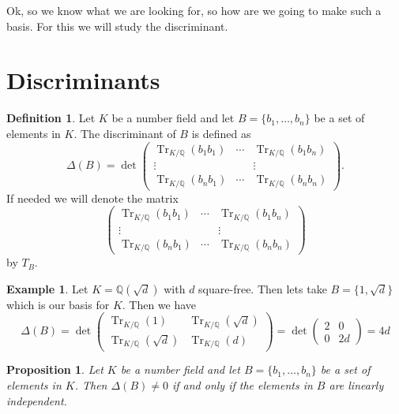 \documentclass[11pt,a4paper]{report}
\theoremstyle{plain}
\newtheorem{prop}[subsection]{Proposition}
\theoremstyle{definition}
\newtheorem{definition}[subsection]{Definition}
\newtheorem{exmp}[subsection]{Example}
\theoremstyle{definition}
\newcommand{\Tr}{\operatorname{Tr}}
\def\QQ{\mathbb{Q}}
\newcommand{\matrd}[4]{\begin{pmatrix}#1&#2\\#3&#4\end{pmatrix}}
\begin{document}
	Ok, so we know what we are looking for, so how are we going to make such a basis. For this we will study the discriminant.
	
	\section{Discriminants}
	
	\begin{definition}
		Let $K$ be a number field and let $B=\{b_1,\dots,b_n\}$ be a set of elements in $K$. The discriminant of $B$ is defined as \[\Delta(B)=  \det \left (\begin{matrix} \Tr_{K/\QQ}(b_1b_1) &\cdots& \Tr_{K/\QQ}(b_1b_n)\\ \vdots & & \vdots \\  \Tr_{K/\QQ}(b_nb_1) &\cdots& \Tr_{K/\QQ}(b_nb_n)
		\end{matrix} \right ).\] If needed we will denote the matrix \[\left (\begin{matrix} \Tr_{K/\QQ}(b_1b_1) &\cdots& \Tr_{K/\QQ}(b_1b_n)\\ \vdots & & \vdots \\  \Tr_{K/\QQ}(b_nb_1) &\cdots& \Tr_{K/\QQ}(b_nb_n)
		\end{matrix} \right )\] by $T_B$.
	\end{definition}
	
	\begin{exmp}
		Let $K=\QQ(\sqrt{d})$ with $d$ square-free. Then lets take $B=\{1,\sqrt{d}\}$ which is our basis for $K$. Then we have \[\Delta(B)=\det   \matrd{\Tr_{K/\QQ}(1)}{\Tr_{K/\QQ}(\sqrt{d})}{\Tr_{K/\QQ}(\sqrt{d})}{\Tr_{K/\QQ}(d)} =\det \matrd{2}{0}{0}{2d}=4d\]	
	\end{exmp}
	
	\begin{prop}
		Let $K$ be a number field and let $B=\{b_1,\dots,b_n\}$ be a set of elements in $K$. Then $\Delta(B) \neq 0$ if and only if the elements in $B$ are linearly independent.
	\end{prop}
	
\end{document}
